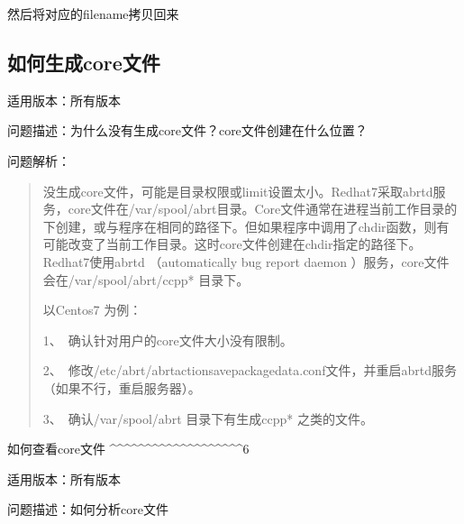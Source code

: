 \documentclass[letterpaper,10pt,english]{sphinxmanual}
\let\sphinxpxdimen\pdfpxdimen\else\newdimen\sphinxpxdimen
\begin{document}
然后将对应的filename拷贝回来


\subsection{如何生成core文件}
\label{\detokenize{sql:id4}}
适用版本：所有版本

问题描述：为什么没有生成core文件？core文件创建在什么位置？

问题解析：
\begin{quote}

没生成core文件，可能是目录权限或limit设置太小。Redhat7采取abrtd服务，core文件在/var/spool/abrt目录。Core文件通常在进程当前工作目录的下创建，或与程序在相同的路径下。但如果程序中调用了chdir函数，则有可能改变了当前工作目录。这时core文件创建在chdir指定的路径下。Redhat7使用abrtd （automatically bug report daemon ）服务，core文件会在/var/spool/abrt/ccpp* 目录下。

以Centos7 为例：

1、 确认针对用户的core文件大小没有限制。

\begin{figure}[htbp]
\centering

\noindent\sphinxincludegraphics[width=243\sphinxpxdimen,height=34\sphinxpxdimen]{{FAQ2141}.png}
\end{figure}

2、 修改/etc/abrt/abrt\sphinxhyphen{}action\sphinxhyphen{}save\sphinxhyphen{}package\sphinxhyphen{}data.conf文件，并重启abrtd服务（如果不行，重启服务器）。

\begin{sphinxVerbatim}[commandchars=\\\{\}]
  
  
\end{sphinxVerbatim}

3、 确认/var/spool/abrt 目录下有生成ccpp* 之类的文件。
\end{quote}

如何查看core文件
\textasciicircum{}\textasciicircum{}\textasciicircum{}\textasciicircum{}\textasciicircum{}\textasciicircum{}\textasciicircum{}\textasciicircum{}\textasciicircum{}\textasciicircum{}\textasciicircum{}\textasciicircum{}\textasciicircum{}\textasciicircum{}\textasciicircum{}\textasciicircum{}\textasciicircum{}\textasciicircum{}\textasciicircum{}6

适用版本：所有版本

问题描述：如何分析core文件
\end{document}
